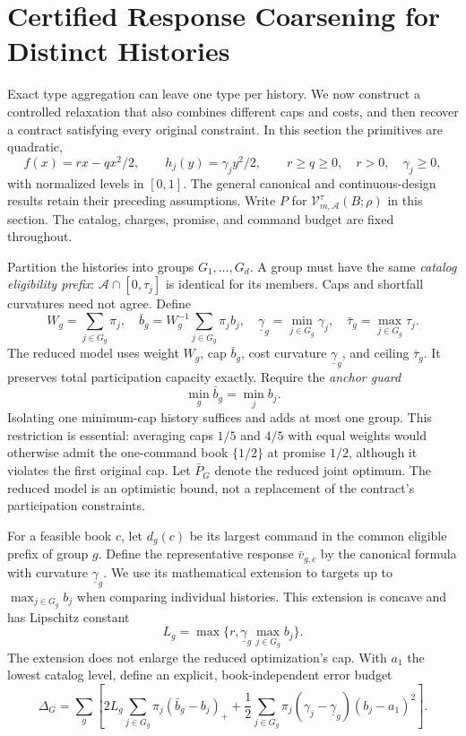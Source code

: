 \section{Certified Response Coarsening for Distinct Histories}\label{sec:r47-coarsening}
Exact type aggregation can leave one type per history. We now construct a controlled relaxation that also combines different caps and costs, and then recover a contract satisfying every original constraint. In this section the primitives are quadratic,
\[
 f(x)=rx-qx^2/2,\qquad h_j(y)=\gamma_jy^2/2,
 \qquad r\geq q\geq0,\quad r>0,\quad\gamma_j\geq0,
\]
with normalized levels in $[0,1]$. The general canonical and continuous-design results retain their preceding assumptions. Write $P$ for $\mathcal V_{m,\mathcal A}^{\tau}(B;\rho)$ in this section. The catalog, charges, promise, and command budget are fixed throughout.

Partition the histories into groups $G_1,\ldots,G_d$. A group must have the same \emph{catalog eligibility prefix}: $\mathcal A\cap[0,\tau_j]$ is identical for its members. Caps and shortfall curvatures need not agree. Define
\begin{equation}\label{eq:r47-representative}
 W_g=\sum_{j\in G_g}\pi_j,\quad
 \bar b_g=W_g^{-1}\sum_{j\in G_g}\pi_jb_j,\quad
 \underline\gamma_g=\min_{j\in G_g}\gamma_j,\quad
 \bar\tau_g=\max_{j\in G_g}\tau_j.
\end{equation}
The reduced model uses weight $W_g$, cap $\bar b_g$, cost curvature $\underline\gamma_g$, and ceiling $\bar\tau_g$. It preserves total participation capacity exactly. Require the \emph{anchor guard}
\begin{equation}\label{eq:r47-guard}
 \min_g\bar b_g=\min_jb_j.
\end{equation}
Isolating one minimum-cap history suffices and adds at most one group. This restriction is essential: averaging caps $1/5$ and $4/5$ with equal weights would otherwise admit the one-command book $\{1/2\}$ at promise $1/2$, although it violates the first original cap. Let $\bar P_G$ denote the reduced joint optimum. The reduced model is an optimistic bound, not a replacement of the contract's participation constraints.

For a feasible book $c$, let $d_g(c)$ be its largest command in the common eligible prefix of group $g$. Define the representative response $\bar v_{g,c}$ by the canonical formula with curvature $\underline\gamma_g$. We use its mathematical extension to targets up to $\max_{j\in G_g}b_j$ when comparing individual histories. This extension is concave and has Lipschitz constant
\begin{equation}\label{eq:r47-L}
 L_g=\max\{r,\underline\gamma_g\max_{j\in G_g}b_j\}.
\end{equation}
The extension does not enlarge the reduced optimization's cap. With $a_1$ the lowest catalog level, define an explicit, book-independent error budget
\begin{equation}\label{eq:r47-Delta}
 \Delta_G=\sum_g\left[2L_g\sum_{j\in G_g}\pi_j(\bar b_g-b_j)_+
       +\frac12\sum_{j\in G_g}\pi_j(\gamma_j-\underline\gamma_g)(b_j-a_1)^2\right].
\end{equation}

